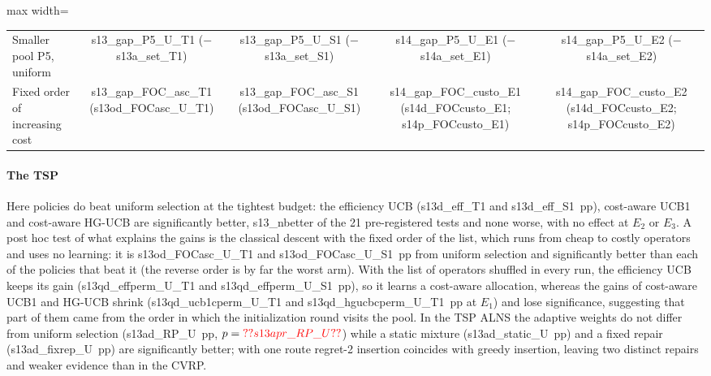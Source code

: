 \begin{table}[t]
\begin{adjustbox}{max width=\linewidth}
\begin{tabular}{lcccc}
\addlinespace
Smaller pool P5, uniform & \num{s13_gap_P5_U_T1} ($-$\num{s13a_set_T1}) & \num{s13_gap_P5_U_S1} ($-$\num{s13a_set_S1}) & \num{s14_gap_P5_U_E1} ($-$\num{s14a_set_E1}) & \num{s14_gap_P5_U_E2} ($-$\num{s14a_set_E2}) \\
Fixed order of increasing cost & \num{s13_gap_FOC_asc_T1} (\num{s13od_FOCasc_U_T1}) & \num{s13_gap_FOC_asc_S1} (\num{s13od_FOCasc_U_S1}) & \num{s14_gap_FOC_custo_E1} (\num{s14d_FOCcusto_E1}; \num{s14p_FOCcusto_E1}) & \num{s14_gap_FOC_custo_E2} (\num{s14d_FOCcusto_E2}; \num{s14p_FOCcusto_E2}) \\
\bottomrule
\end{tabular}
\end{adjustbox}
\end{table}

\paragraph{The TSP} Here policies do beat uniform selection at the tightest budget: the efficiency UCB (\num{s13d_eff_T1} and \num{s13d_eff_S1}~pp), cost-aware UCB1 and cost-aware HG-UCB are significantly better, \num{s13_nbetter} of the 21 pre-registered tests and none worse, with no effect at $E_2$ or $E_3$. A post hoc test of what explains the gains is the classical descent with the fixed order of the list, which runs from cheap to costly operators and uses no learning: it is \num{s13od_FOCasc_U_T1} and \num{s13od_FOCasc_U_S1}~pp from uniform selection and significantly better than each of the policies that beat it (the reverse order is by far the worst arm). With the list of operators shuffled in every run, the efficiency UCB keeps its gain (\num{s13qd_effperm_U_T1} and \num{s13qd_effperm_U_S1}~pp), so it learns a cost-aware allocation, whereas the gains of cost-aware UCB1 and HG-UCB shrink (\num{s13qd_ucb1cperm_U_T1} and \num{s13qd_hgucbcperm_U_T1}~pp at $E_1$) and lose significance, suggesting that part of them came from the order in which the initialization round visits the pool. In the TSP ALNS the adaptive weights do not differ from uniform selection (\num{s13ad_RP_U}~pp, $p=\num{s13apr_RP_U}$) while a static mixture (\num{s13ad_static_U}~pp) and a fixed repair (\num{s13ad_fixrep_U}~pp) are significantly better; with one route regret-2 insertion coincides with greedy insertion, leaving two distinct repairs and weaker evidence than in the CVRP.

